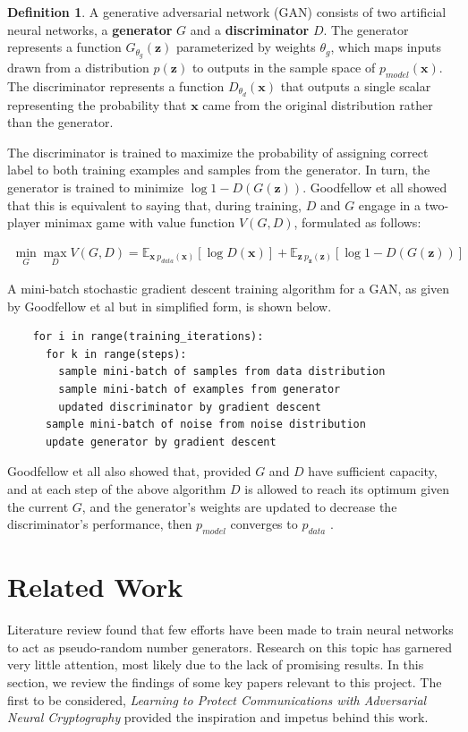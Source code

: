 \documentclass[12pt, titlepage]{report}
\theoremstyle{definition}
\newtheorem{definition}{Definition}
\begin{document}
\begin{definition}
A generative adversarial network (GAN) consists of two artificial neural networks, a \textbf{generator} $G$ and a \textbf{discriminator} $D$. The generator represents a function $G_{\theta_{g}}(\bm{z})$ parameterized by weights $\theta_g$, which maps inputs drawn from a distribution $p(\bm{z})$ to outputs in the sample space of $p_{model}(\bm{x})$. The discriminator represents a function $D_{\theta_d}(\bm{x})$ that outputs a single scalar representing the probability that $\bm{x}$ came from the original distribution rather than the generator.

The discriminator is trained to maximize the probability of assigning correct label to both training examples and samples from the generator. In turn, the generator is trained to minimize $\log{1 - D(G(\bm{z}))}$. Goodfellow et all \cite[p. 3]{goodfellow2014generative} showed that this is equivalent to saying that, during training, $D$ and $G$ engage in a two-player minimax game with value function $V(G, D)$, formulated as follows:

\begin{gather}\label{eq:gan_train}
\min_G{\max_D{V(G, D)}} = \mathbb{E}_{\bm{x}~p_{data}(\bm{x})}[\log{D(\bm{x})}] + \mathbb{E}_{\bm{z}~p_{\bm{z}}(\bm{z})}[\log{1 - D(G(\bm{z}))}]
\end{gather}
\end{definition}

A mini-batch stochastic gradient descent training algorithm for a GAN, as given by Goodfellow et al but in simplified form, is shown below.


\begin{verbatim}
    for i in range(training_iterations):
      for k in range(steps):
        sample mini-batch of samples from data distribution
        sample mini-batch of examples from generator
        updated discriminator by gradient descent
      sample mini-batch of noise from noise distribution
      update generator by gradient descent
\end{verbatim}

Goodfellow et all also showed that, provided $G$ and $D$ have sufficient capacity, and at each step of the above algorithm $D$ is allowed to reach its optimum given the current $G$, and the generator's weights are updated to decrease the discriminator's performance, then $p_{model}$ converges to $p_{data}$ \cite[p. 5]{goodfellow2014generative}.



\section{Related Work}\label{section:related_work}
Literature review found that few efforts have been made to train neural networks to act as pseudo-random number generators. Research on this topic has garnered very little attention, most likely due to the lack of promising results. In this section, we review the findings of some key papers relevant to this project. The first to be considered, \textit{Learning to Protect Communications with Adversarial Neural Cryptography} provided the inspiration and impetus behind this work.
\end{document}

